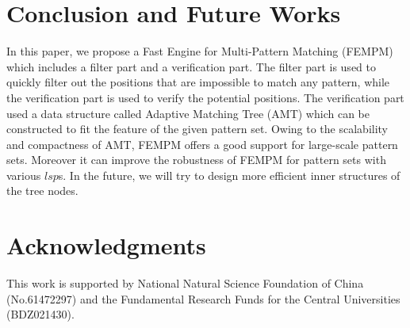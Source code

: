 \section{Conclusion and Future Works}
\label{sec:conclusion}

In this paper, we propose a Fast Engine for Multi-Pattern Matching
(\textsf{FEMPM}) which includes a filter part and a verification
part. The filter part is used to quickly filter out the positions that
are impossible to match any pattern, while the verification part is
used to verify the potential positions. The verification part used a
data structure called Adaptive Matching Tree (AMT) which can be
constructed to fit the feature of the given pattern set. Owing to the
scalability and compactness of AMT, \textsf{FEMPM} offers a good
support for large-scale pattern sets. Moreover it can improve the
robustness of \textsf{FEMPM} for pattern sets with various $lsp$s. In
the future, we will try to design more efficient inner structures of
the tree nodes.

\section{Acknowledgments}

This work is supported by National Natural Science Foundation of China
(No.61472297) and the Fundamental Research Funds for the Central
Universities (BDZ021430).


